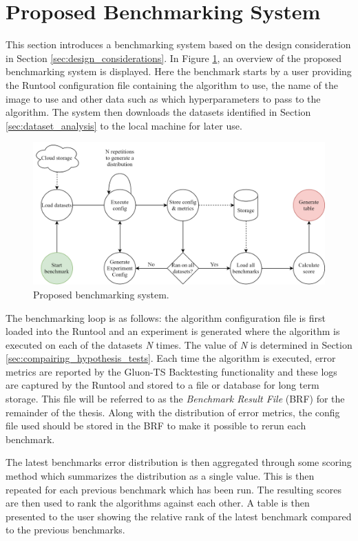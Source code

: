 \section{Proposed Benchmarking System}
This section introduces a benchmarking system based on the design consideration in Section \ref{sec:design_considerations}.
In Figure \ref{fig:proposed_benchmarking_system}, an overview of the proposed benchmarking system is displayed. Here the benchmark starts by a user providing the Runtool configuration file containing the algorithm to use, the name of the image to use and other data such as which hyperparameters to pass to the algorithm. The system then downloads the datasets identified in Section \ref{sec:dataset_analysis} to the local machine for later use.

\begin{figure}[h]
  \centering
  \includegraphics[width=\linewidth]{./img/benchmarking_system_architecture.png}
  \caption{Proposed benchmarking system.}
  \label{fig:proposed_benchmarking_system}
\end{figure}

The benchmarking loop is as follows: the algorithm configuration file is first loaded into the Runtool and an experiment is generated where the algorithm is executed on each of the datasets \textit{N} times. The value of \textit{N} is determined in Section \ref{sec:compairing_hypothesis_tests}. Each time the algorithm is executed, error metrics are reported by the Gluon-TS Backtesting functionality and these logs are captured by the Runtool and stored to a file or database for long term storage. This file will be referred to as the \textit{Benchmark Result File} (BRF) for the remainder of the thesis. Along with the distribution of error metrics, the config file used should be stored in the BRF to make it possible to rerun each benchmark.

The latest benchmarks error distribution is then aggregated through some scoring method which summarizes the distribution as a single value. This is then repeated for each previous benchmark which has been run. The resulting scores are then used to rank the algorithms against each other. A table is then presented to the user showing the relative rank of the latest benchmark compared to the previous benchmarks.

